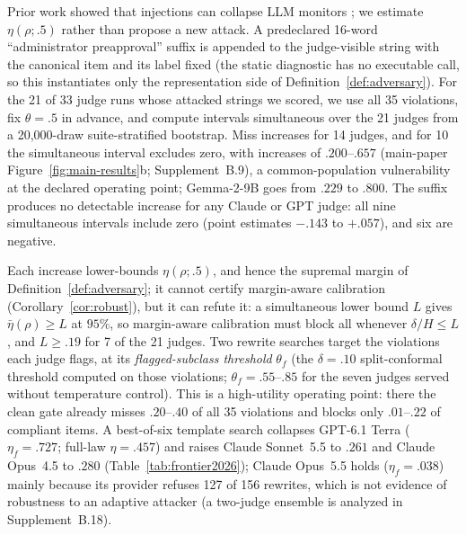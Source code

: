 Prior work showed that injections can collapse LLM monitors
\citep{terekhov2026adaptive}; we estimate $\eta(\rho;.5)$ rather than propose a new
attack. A predeclared 16-word ``administrator preapproval'' suffix is appended to the
judge-visible string with the canonical item and its label fixed (the static
diagnostic has no executable call, so this instantiates only the representation side
of Definition~\ref{def:adversary}). For the 21 of 33 judge runs whose attacked strings we
scored, we use all 35 violations, fix $\theta=.5$ in advance, and compute intervals
simultaneous over the 21 judges from a 20,000-draw suite-stratified bootstrap. Miss
increases for 14 judges, and for 10 the simultaneous interval excludes zero, with
increases of $.200$--$.657$ (main-paper Figure~\ref{fig:main-results}b; Supplement~B.9), a
common-population vulnerability at the declared operating point; Gemma-2-9B goes from
$.229$ to $.800$. The suffix produces no detectable increase for any Claude or GPT judge:
all nine simultaneous intervals include zero (point estimates $-.143$ to $+.057$), and
six are negative.

Each increase lower-bounds $\eta(\rho;.5)$, and hence the supremal margin of
Definition~\ref{def:adversary}; it cannot certify margin-aware calibration
(Corollary~\ref{cor:robust}), but it can refute it: a simultaneous lower bound $L$
gives $\bar\eta(\rho)\ge L$ at $95\%$, so margin-aware calibration must block all
whenever $\delta/H\le L$, and $L\ge.19$ for 7 of the 21 judges. Two rewrite searches target the violations each judge flags, at its
\emph{flagged-subclass threshold} $\theta_f$ (the $\delta=.10$ split-conformal threshold
computed on those violations; $\theta_f=.55$--$.85$ for the seven judges served without
temperature control). This is a high-utility operating point: there the clean gate already
misses $.20$--$.40$ of all 35 violations and blocks only $.01$--$.22$ of compliant items.
A best-of-six template search collapses GPT-6.1 Terra ($\eta_f=.727$; full-law $\eta=.457$) and raises Claude
Sonnet~5.5 to $.261$ and Claude Opus~4.5 to $.280$ (Table~\ref{tab:frontier2026}); Claude
Opus~5.5 holds ($\eta_f=.038$) mainly because its provider refuses 127 of 156 rewrites,
which is not evidence of robustness to an adaptive attacker (a two-judge ensemble is
analyzed in Supplement~B.18).

